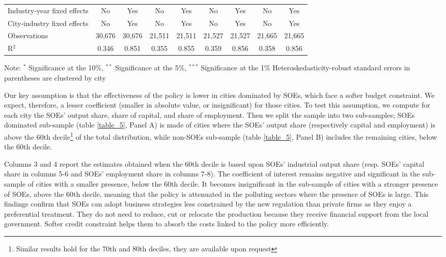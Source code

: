 \documentclass[12pt]{article}
\begin{document}
\begin{table}[!htb]
\begin{adjustbox}{width=\textwidth, totalheight=\baselineskip,keepaspectratio}
\begin{tabular}{@{\extracolsep{5pt}}lcccccccc}
Industry-year fixed effects & No & Yes & No & Yes & No & Yes & No & Yes \\ 
City-industry fixed effects & No & Yes & No & Yes & No & Yes & No & Yes \\ 
Observations & 30,676 & 30,676 & 21,511 & 21,511 & 21,527 & 21,527 & 21,665 & 21,665 \\ 
R$^{2}$ & 0.346 & 0.851 & 0.355 & 0.855 & 0.359 & 0.856 & 0.358 & 0.856 \\ 
    \end{tabular}
    \end{adjustbox}
    \begin{tablenotes}
      \small
      \item 
      Note: $^{*}$ Significance at the 10\%, $^{**}$ Significance at the 5\%, $^{***}$ Significance at the 1\% Heteroskedasticity-robust standard errors in parentheses are clustered by city
\end{tablenotes}
\end{table}




Our key assumption is that the effectiveness of the policy is lower in cities dominated by SOEs, which face a softer budget constraint. We expect, therefore, a lesser coefficient (smaller in absolute value, or insignificant) for those cities. To test this assumption, we compute for each city the SOEs' output share, share of capital, and share of employment. Then we split the sample into two sub-samples; SOEs dominated sub-sample (table \ref{table_5}, Panel A) is made of cities where the SOEs' output share (respectively capital and employment) is above the 60th decile\footnote{ Similar results hold for the 70th and 80th deciles, they are available upon request } of the total distribution, while non-SOEs sub-sample (table \ref{table_5}, Panel B) includes the remaining cities, below the 60th decile. 


Columns 3 and 4 report the estimates obtained when the 60th decile is based upon SOEs' industrial output share (resp. SOEs' capital share in columns 5-6 and SOEs' employment share in columns 7-8). The coefficient of interest remains negative and significant in the sub-sample of cities with a smaller presence, below the 60th decile. It becomes insignificant in the sub-sample of cities with a stronger presence of SOEs, above the 60th decile, meaning that the policy is attenuated in the polluting sectors where the presence of SOEs is large. This findings confirm that SOEs can adopt business strategies less constrained by the new regulation than private firms as they enjoy a preferential treatment. They do not need to reduce, cut or relocate the production because they receive financial support from the local government. Softer credit constraint helps them to absorb the costs linked to the policy more efficiently. 
\end{document}
